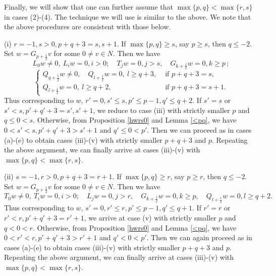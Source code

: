 \documentclass[12pt]{article}
\numberwithin{equation}{section}
\begin{document}
Finally, we will show that one can further assume that $\max\{p,q\}< \max\{r,s\}$ in cases (2)-(4). The technique we will use is similar to the above. We note that the above procedures are consistent with those below.


(i) $r=-1, s>0, p+q+3=s, s+1$. If  $\max\{p,q\}\ge s$, say $p\ge s$, then $q\le -2$. Set $w=G_{p+\frac{1}{2}}v$ for some $0\ne v\in N$. Then we have
$$ L_0w\ne 0,\ L_iw=0,i>0; \quad T_jw=0, j>s,\quad G_{k+\frac{1}{2}}w=0,k\ge p\,; $$
$$\left\{\begin{array}{rl} Q_{q+\frac{5}{2}}w\ne 0, \quad  Q_{l+\frac{1}{2}}w = 0,\ l\ge q+3,& \mbox{ if } p+q+3=s,\\
 Q_{l+\frac{1}{2}}w= 0,\ l\ge q+2,& \mbox{ if } p+q+3=s+1.\end{array}\right.$$
 Thus corresponding to $w$, $r'=0, s'\le s,p'\le p-1, q'\le q+2.$
If $s'=s$ or $s'<s, p'+q'+3=s',s'+1$, we reduce to case (iii) with strictly smaller $p$ and $q\le 0<s$. Otherwise, from Proposition \ref{hwrs0} and Lemma \ref{<pq}, we have $0<s'<s, p'+q'+3>s'+1$ and $q'\le 0<p'$. Then we can proceed as in  cases (a)-(e) to obtain cases  (iii)-(v) with strictly smaller $p+q+3$ and $p$. Repeating the above argument, we can finally arrive at   cases (iii)-(v) with $\max\{p,q\}< \max\{r,s\}.$



(ii) $s=-1,r>0, p+q+3=r+1$. If  $\max\{p,q\}\ge r$, say $p\ge r$, then $q\le -2$. Set $w=G_{p+\frac{1}{2}}v$ for some $0\ne v\in N$. Then we have
$$ T_0w\ne 0,\ T_iw=0,i>0; \quad L_jw=0, j>r,\quad G_{k+\frac{1}{2}}w=0,k\ge p,\quad Q_{l+\frac{1}{2}}w= 0,l\ge q+2.$$
Thus corresponding to $w$, $s'=0, r'\le r,p'\le p-1, q'\le q+1.$
If $r'=r$ or $r'<r, p'+q'+3=r'+1$, we arrive at case (v) with strictly smaller $p$ and $q<0<r$. Otherwise, from Proposition \ref{hwrs0} and Lemma \ref{<pq}, we have $0<r'<r, p'+q'+3>r'+1$ and $q'<0<p'$. Then we can  again  proceed as in  cases (a)-(e) to obtain cases  (iii)-(v) with strictly smaller $p+q+3$ and $p$. Repeating the above argument, we can finally arrive at  cases (iii)-(v) with $\max\{p,q\}< \max\{r,s\}.$
\end{document}
